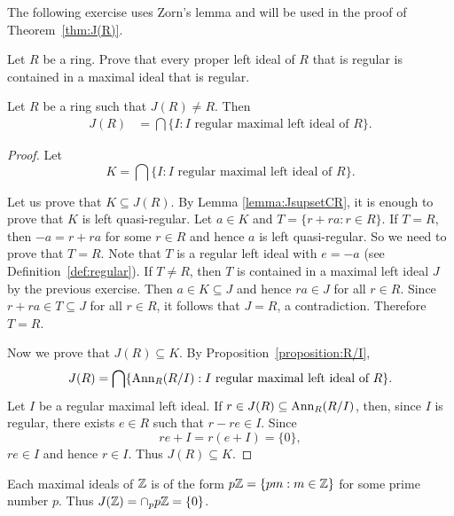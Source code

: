 The following exercise uses Zorn's lemma 
and will be used in the proof of Theorem~\ref{thm:J(R)}. 

\begin{exercise}
\label{xca:regular}
    Let $R$ be a ring. 
    Prove that every proper left ideal of $R$ that 
    is regular is contained in a maximal ideal that is regular. 
\end{exercise}

\begin{theorem}
	\label{thm:J(R)}
	Let $R$ be a ring such that $J(R)\ne R$. Then 
	\begin{align*}
		J(R)&=\bigcap\{I:\text{$I$ regular maximal left ideal of $R$}\}.
	\end{align*}
\end{theorem}

\begin{proof}
        Let 
	\[
	K=\bigcap\{I:\text{$I$ regular maximal left ideal of $R$}\}.
	\]
        
        Let us prove that $K\subseteq J(R)$. By Lemma \ref{lemma:JsupsetCR}, 
        it is enough to prove that $K$ is left quasi-regular. 
        Let $a\in K$ and $T=\{r+ra:r\in R\}$. 
        If $T=R$, then $-a=r+ra$ for some $r\in R$ and hence 
        $a$ is left quasi-regular. So we need to prove that $T=R$. Note that 
        $T$ is a regular left ideal with $e=-a$ (see Definition~\ref{def:regular}). If $T\ne R$, then $T$ is contained in a maximal left ideal $J$  
        by the previous exercise. Then 
        $a\in K\subseteq J$ and hence $ra\in J$ for all $r\in R$. Since 
        $r+ra\in T\subseteq J$ for all $r\in R$, it follows that $J=R$, a contradiction. Therefore $T=R$. 
        
        Now we prove that $J(R)\subseteq K$. 
		By
	Proposition~\ref{proposition:R/I}, 
	\[
		J(R)=\bigcap\{\operatorname{Ann}_R(R/I):I\text{ regular maximal left ideal of $R$}\}.
	\]
	Let $I$ be a regular maximal left ideal. If $r\in J(R)\subseteq
	\operatorname{Ann}_R(R/I)$, then, since $I$ is regular, there exists $e\in R$ such that
	$r-re\in I$. Since 
	\[
	re+I=r(e+I)=\{0\},
	\]
	$re\in I$ and hence $r\in I$. Thus $J(R)\subseteq K$. 
\end{proof}

\begin{example}
	Each maximal ideals of $\mathbb{Z}$ is of the form $p\mathbb{Z}=\{pm:m\in\mathbb{Z}\}$ for some prime number $p$. 
	Thus $J(\mathbb{Z})=\cap_p p\mathbb{Z}=\{0\}$.
\end{example}



